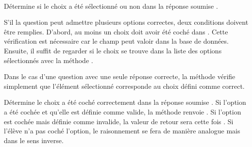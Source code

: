 \documentclass[a4,10pt,french]{sphinxmanual}
\begin{document}

\begin{fulllineitems}
\label{source:quiz.models.QcmChoice}~

\begin{fulllineitems}
\label{source:quiz.models.QcmChoice.checked}
Détermine si le choix a été sélectionné ou non dans la réponse soumise
.

S'il la question peut admettre plusieurs options correctes, deux conditions doivent
être remplies. D'abord, au moins un choix doit avoir été coché dans .
Cette vérification est nécessaire car le champ  peut
valoir  dans la base de données. Ensuite, il suffit de regarder
si le choix se trouve dans la liste des options sélectionnés avec la méthode
.

Dans le cas d'une question avec une seule réponse correcte, la méthode
vérifie simplement que l'élément sélectionné corresponde au choix défini comme
correct.

\end{fulllineitems}


\begin{fulllineitems}
\label{source:quiz.models.QcmChoice.correct_submit}
Détermine le choix  a été coché correctement dans la réponse
soumise . Si l'option a été cochée et qu'elle est définie
comme valide, la méthode renvoie . Si l'option est cochée mais
définie comme invalide, la valeur de retour sera cette fois .
Si l'élève n'a pas coché l'option, le raisonnement se fera de manière analogue
mais dans le sens inverse.

\end{fulllineitems}


\end{fulllineitems}

\end{document}
